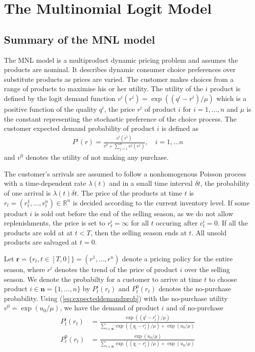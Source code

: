 \section{The Multinomial Logit Model}


\subsection{Summary of the MNL model}
The MNL model is a multiproduct dynamic pricing problem and assumes the products are nominal. It describes dynamic consumer choice preferences over substitute products as prices are varied. The customer makes choices from a range of products to maximise his or her utility. The utility of the $i$ product is defined by the logit demand function $v^i(r^i) = \exp ((q^i-r^i)/\mu)$ which is a positive function of the quality $q^i$, the price $r^i$ of product $i$ for $i=1,\ldots, n$ and $\mu$ is the constant representing the stochastic preference of the choice process. The customer expected demand probability of product $i$ is defined as 
\begin{align}
P^i(r) = \frac{v^i(r^i)}{v^0+\sum_{j=1}^{n}v^j(r^j)},\quad i = 1, \ldots n\label{eq:expecteddemandprob}
\end{align}
and $v^0$ denotes the utility of not making any purchase.


The customer's arrivals are assumed to follow a nonhomogenous Poisson process with a time-dependent rate $\lambda(t)$ and in a small time interval $\delta t$, the probability of one arrival is $\lambda(t)\delta t$. The price of the products at time $t$ is $r_t = (r_t^1,\ldots,r_t^n) \in \mathbb{R}^n$ is decided according to the current inventory level. If some product $i$ is sold out before the end of the selling season, as we do not allow replenishments, the price is set to $r^i_t = \infty$ for all $t$ occuring after $c^i_t=0$. If all the products are sold at at $t < T$, then the selling season ends at $t$. All unsold products are salvaged at $t=0$. 


Let $\mathbf{r}=\{r_t, t \in [T,0]\} = (r^1, \ldots, r^n)$ denote a pricing policy for the entire season, where $r^i$ denotes the trend of the price of product $i$ over the selling season. We denote the probabilty for a customer to arrive at time $t$ to choose product $i \in \mathbf{n} = \{1,\ldots, n\}$ by $P_t^i(r_t)$ and $P_t^0(r_t)$ denotes the no-purchase probability. Using (\ref{eq:expecteddemandprob}) with the no-purchase utility $v^0 = \exp (u_0/\mu)$, we have the demand of product $i$ and of no-purchase
\begin{align}
P_t^i(r_t) &= \frac{\exp((q^i-r^i_t)/\mu)}{\sum_{i \in \mathbf{n}}\exp((q_i-r^i_t)/\mu)+\exp(u_0/\mu)} \label{eq:probi}\\
P_t^0(r_t)&= \frac{\exp(u_0/\mu)}{\sum_{i \in \mathbf{n}}\exp((q_i-r^i_t)/\mu)+\exp(u_0/\mu)}\label{eq:prob0}
\end{align}

